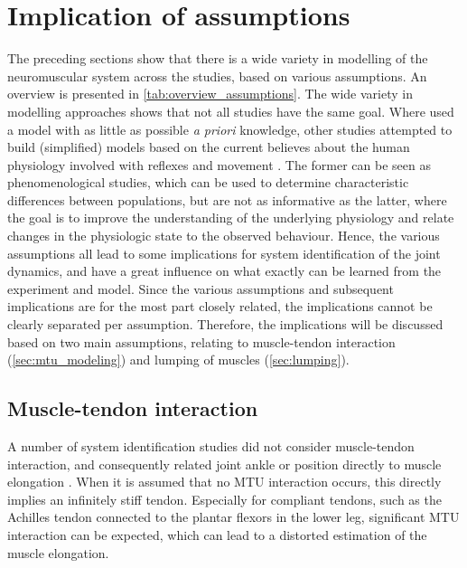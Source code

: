 \section{Implication of assumptions}
The preceding sections show that there is a wide variety in modelling of the neuromuscular system across the studies, based on various assumptions. An overview is presented in \autoref{tab:overview_assumptions}. The wide variety in modelling approaches shows that not all studies have the same goal. Where \cite{kearney_identification_1997, mirbagheri_intrinsic_2000, de_gooijer-van_de_groep_estimation_2016, jalaleddini_subspace_2017} used a model with as little as possible \textit{a priori} knowledge, other studies attempted to build (simplified) models based on the current believes about the human physiology involved with reflexes and movement \cite{zhang_simultaneous_1997, van_der_helm_identification_2002, schouten_nmclab_2008, mugge_rigorous_2010}. The former can be seen as phenomenological studies, which can be used to determine characteristic differences between populations, but are not as informative as the latter, where the goal is to improve the understanding of the underlying physiology and relate changes in the physiologic state to the observed behaviour. Hence, the various assumptions all lead to some implications for system identification of the joint dynamics, and have a great influence on what exactly can be learned from the experiment and model. Since the various assumptions and subsequent implications are for the most part closely related, the implications cannot be clearly separated per assumption. Therefore, the implications will be discussed based on two main assumptions, relating to muscle-tendon interaction (\autoref{sec:mtu_modeling}) and lumping of muscles (\autoref{sec:lumping}). 


\subsection{Muscle-tendon interaction}
A number of system identification studies did not consider muscle-tendon interaction, and consequently related joint ankle or position directly to muscle elongation \cite{zhang_simultaneous_1997, kearney_identification_1997, mirbagheri_intrinsic_2000, van_der_helm_identification_2002, de_gooijer-van_de_groep_estimation_2016}. When it is assumed that no MTU interaction occurs, this directly implies an infinitely stiff tendon. Especially for compliant tendons, such as the Achilles tendon connected to the plantar flexors in the lower leg, significant MTU interaction can be expected, which can lead to a distorted \tred[(over)]estimation of the muscle elongation. %

